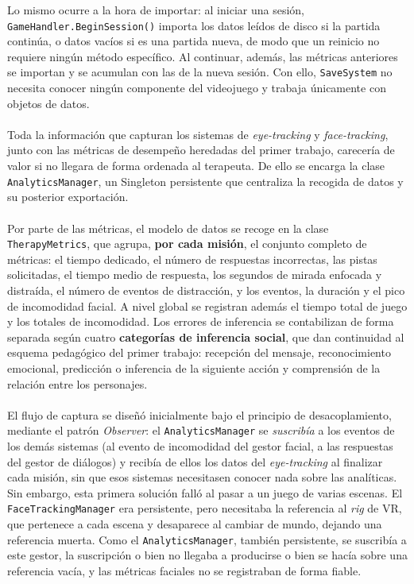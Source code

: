 \documentclass[12pt,twoside,titlepage]{report}
\begin{document}
Lo mismo ocurre a la hora de importar: al iniciar una sesión, \texttt{GameHandler.BeginSession()} importa los datos leídos de disco si la partida continúa, o datos vacíos si es una partida nueva, de modo que un reinicio no requiere ningún método específico.
Al continuar, además, las métricas anteriores se importan y se acumulan con las de la nueva sesión. Con ello, \texttt{SaveSystem} no necesita conocer ningún componente del videojuego y trabaja únicamente con objetos de datos.
\\\\
Toda la información que capturan los sistemas de \textit{eye-tracking} y \textit{face-tracking}, junto con las métricas de desempeño heredadas del primer trabajo, carecería de valor si no llegara de forma ordenada al terapeuta.
De ello se encarga la clase \texttt{AnalyticsManager}, un Singleton persistente que centraliza la recogida de datos y su posterior exportación.\\
\\
Por parte de las métricas, el modelo de datos se recoge en la clase \texttt{TherapyMetrics}, que agrupa, \textbf{por cada misión}, el conjunto completo de métricas: el tiempo dedicado, el número de respuestas incorrectas, las pistas solicitadas, el tiempo medio de respuesta, los segundos de mirada enfocada y distraída, el número de eventos de distracción, y los eventos, la duración y el pico de incomodidad facial.
A nivel global se registran además el tiempo total de juego y los totales de incomodidad.
Los errores de inferencia se contabilizan de forma separada según cuatro \textbf{categorías de inferencia social}, que dan continuidad al esquema pedagógico del primer trabajo: recepción del mensaje, reconocimiento emocional, predicción o inferencia de la siguiente acción y comprensión de la relación entre los personajes.\\
\\
El flujo de captura se diseñó inicialmente bajo el principio de desacoplamiento, mediante el patrón \textit{Observer}: el \texttt{AnalyticsManager} se \textit{suscribía} a los eventos de los demás sistemas (al evento de incomodidad del gestor facial, a las respuestas del gestor de diálogos) y recibía de ellos los datos del \textit{eye-tracking} al finalizar cada misión, sin que esos sistemas necesitasen conocer nada sobre las analíticas.
Sin embargo, esta primera solución falló al pasar a un juego de varias escenas. El \texttt{FaceTrackingManager} era persistente, pero necesitaba la referencia al \textit{rig} de VR, que pertenece a cada escena y desaparece al cambiar de mundo, dejando una referencia muerta. Como el \texttt{AnalyticsManager}, también persistente, se suscribía a este gestor, la suscripción o bien no llegaba a producirse o bien se hacía sobre una referencia vacía, y las métricas faciales no se registraban de forma fiable.
\end{document}
